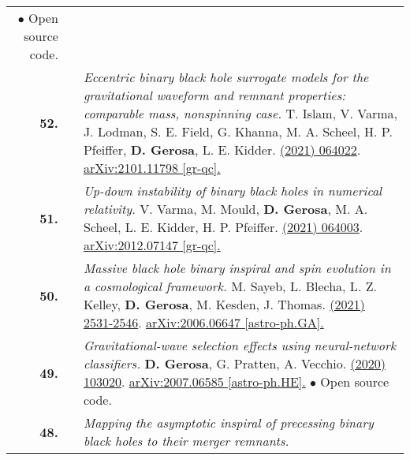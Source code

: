 {\begin{longtable}{rp{0.3cm}p{15.8cm}}
\newline{}
\textcolor{color1}{$\bullet$} Open source code.
\vspace{0.09cm}\\
%
\textbf{52.} & & \textit{Eccentric binary black hole surrogate models for the gravitational waveform and remnant properties: comparable mass, nonspinning case.}
\newline{}
T. Islam, V. Varma, J. Lodman, S. E. Field, G. Khanna, M. A. Scheel, H. P. Pfeiffer,  \textbf{D. Gerosa}, L. E. Kidder.
\newline{}
\href{https://journals.aps.org/prd/abstract/10.1103/PhysRevD.103.064022}{\prd 103 (2021) 064022}. \href{https://arxiv.org/abs/2101.11798}{arXiv:2101.11798 [gr-qc].}
\vspace{0.09cm}\\
%
\textbf{51.} & & \textit{Up-down instability of binary black holes in numerical relativity.}
\newline{}
V. Varma, M. Mould, \textbf{D. Gerosa}, M. A. Scheel, L. E. Kidder, H. P. Pfeiffer.
\newline{}
\href{https://journals.aps.org/prd/abstract/10.1103/PhysRevD.103.064003}{\prd 103 (2021) 064003}. \href{https://arxiv.org/abs/2012.07147}{arXiv:2012.07147 [gr-qc].}
\vspace{0.09cm}\\
%
\textbf{50.} & & \textit{Massive black hole binary inspiral and spin evolution in a cosmological framework.}
\newline{}
M. Sayeb, L. Blecha, L. Z. Kelley, \textbf{D. Gerosa}, M. Kesden, J. Thomas.
\newline{}
\href{https://doi.org/10.1093/mnras/staa3826}{\mnras 501 (2021) 2531-2546}. \href{https://arxiv.org/abs/2006.06647}{arXiv:2006.06647 [astro-ph.GA].}
\vspace{0.09cm}\\
%
\textbf{49.} & & \textit{Gravitational-wave selection effects using neural-network classifiers.}
\newline{}
\textbf{D. Gerosa}, G. Pratten, A. Vecchio.
\newline{}
\href{https://journals.aps.org/prd/abstract/10.1103/PhysRevD.102.103020}{\prd 102 (2020) 103020}. \href{https://arxiv.org/abs/2007.06585}{arXiv:2007.06585 [astro-ph.HE].}
\newline{}
\textcolor{color1}{$\bullet$} Open source code.
\vspace{0.09cm}\\
%
\textbf{48.} & & \textit{Mapping the asymptotic inspiral of precessing binary black holes to their merger remnants.}

\end{longtable}}
